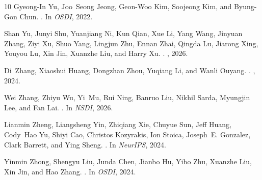 \begin{thebibliography}{10}
Gyeong-In Yu, Joo~Seong Jeong, Geon-Woo Kim, Soojeong Kim, and Byung-Gon Chun.
.
\newblock In {\em OSDI}, 2022.

Shan Yu, Junyi Shu, Yuanjiang Ni, Kun Qian, Xue Li, Yang Wang, Jinyuan Zhang,
  Ziyi Xu, Shuo Yang, Lingjun Zhu, Ennan Zhai, Qingda Lu, Jiarong Xing, Youyou
  Lu, Xin Jin, Xuanzhe Liu, and Harry Xu.
.
, 2026.

Di~Zhang, Xiaoshui Huang, Dongzhan Zhou, Yuqiang Li, and Wanli Ouyang.
.
, 2024.

Wei Zhang, Zhiyu Wu, Yi~Mu, Rui Ning, Banruo Liu, Nikhil Sarda, Myungjin Lee,
  and Fan Lai.
.
\newblock In {\em NSDI}, 2026.

Lianmin Zheng, Liangsheng Yin, Zhiqiang Xie, Chuyue Sun, Jeff Huang, Cody~Hao
  Yu, Shiyi Cao, Christos Kozyrakis, Ion Stoica, Joseph~E. Gonzalez, Clark
  Barrett, and Ying Sheng.
.
\newblock In {\em NeurIPS}, 2024.

Yinmin Zhong, Shengyu Liu, Junda Chen, Jianbo Hu, Yibo Zhu, Xuanzhe Liu, Xin
  Jin, and Hao Zhang.
.
\newblock In {\em OSDI}, 2024.

\end{thebibliography}
